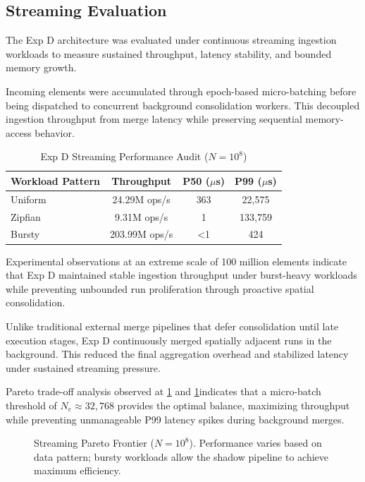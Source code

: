 \subsection{Streaming Evaluation}
The Exp D architecture was evaluated under continuous streaming ingestion workloads to measure sustained throughput, latency stability, and bounded memory growth.

Incoming elements were accumulated through epoch-based micro-batching before being dispatched to concurrent background consolidation workers.
This decoupled ingestion throughput from merge latency while preserving sequential memory-access behavior.

\begin{table}[ht]
\caption{Exp D Streaming Performance Audit ($N=10^8$)}
\label{tab:streaming_audit}
\centering
\begin{tabular}{lccc}
\toprule
Workload Pattern & Throughput & P50 ($\mu$s) & P99 ($\mu$s) \\
\midrule
Uniform & 24.29M ops/s & 363 & 22,575 \\
Zipfian & 9.31M ops/s & 1 & 133,759 \\
Bursty & 203.99M ops/s & <1 & 424 \\
\bottomrule
\end{tabular}
\end{table}

Experimental observations at an extreme scale of 100 million elements indicate that Exp D maintained stable ingestion throughput under burst-heavy workloads while preventing unbounded run proliferation through proactive spatial consolidation.

Unlike traditional external merge pipelines that defer consolidation until late execution stages, Exp D continuously merged spatially adjacent runs in the background.
This reduced the final aggregation overhead and stabilized latency under sustained streaming pressure.

Pareto trade-off analysis observed at \cref{tab:streaming_audit} and \cref{fig:pareto}indicates that a micro-batch threshold of $N_e \approx 32,768$ provides the optimal balance, maximizing throughput while preventing unmanageable P99 latency spikes during background merges.

\begin{figure}[ht]
\centering
{}
\caption{Streaming Pareto Frontier ($N=10^8$). Performance varies based on data pattern; bursty workloads allow the shadow pipeline to achieve maximum efficiency.}
\label{fig:pareto}
\end{figure}


